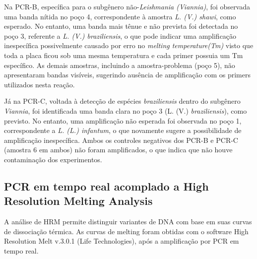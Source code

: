 Na PCR-B, específica para o subgênero não-\textit{Leishmania (Viannia)}, foi observada uma banda nítida no poço 4, correspondente à amostra \textit{L. (V.) shawi}, como esperado. 
No entanto, uma banda mais tênue e não prevista foi detectada no poço 3, referente a \textit{L. (V.) braziliensis}, o que pode indicar uma amplificação inespecífica possivelmente causado
por erro no \textit{melting temperature(Tm)} visto que toda a placa ficou sob uma mesma temperatura e cada primer possuia um Tm específico. As demais amostras, incluindo a amostra-problema 
(poço 5), não apresentaram bandas visíveis, sugerindo ausência de amplificação com os primers utilizados nesta reação.

Já na PCR-C, voltada à detecção de espécies \textit{braziliensis} dentro do subgênero \textit{Viannia}, foi identificada uma banda clara no poço 3 (L. (V.) \textit{braziliensis}), 
como previsto. No entanto, uma amplificação não esperada foi observada no poço 1, correspondente a \textit{L. (L.) infantum}, o que novamente sugere a possibilidade de amplificação inespecífica.
Ambos os controles negativos dos PCR-B e PCR-C (amostra 6 em ambos) não foram amplificados, o que indica que não houve contaminação dos experimentos.

\subsection{PCR em tempo real acomplado a High Resolution Melting Analysis}

A análise de HRM permite distinguir variantes de DNA com base em suas curvas de
dissociação térmica. As curvas de melting foram obtidas com o software High
Resolution Melt v.3.0.1 (Life Technologies), após a amplificação por PCR em
tempo real.

